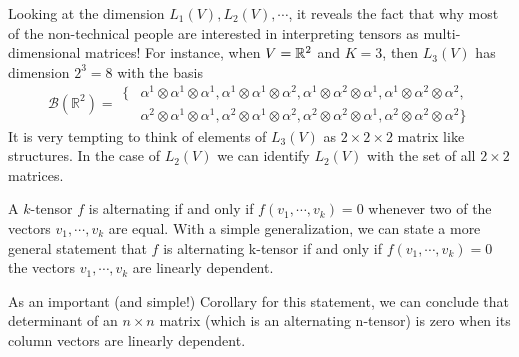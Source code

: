 \begin{summary}
		Looking at the dimension $ L_1(V), L_2(V), \cdots $, it reveals the fact that why most of the non-technical people are interested in interpreting tensors as multi-dimensional matrices! For instance, when $ V = \mathbb{R}^2 $ and $ K=3 $, then $ L_3(V) $ has dimension $ 2^3 = 8 $ with the basis
	\[
	\mathcal{B} (\mathbb{R}^2) = 
	\begin{aligned}
		\{&\alpha^1 \otimes \alpha^1 \otimes \alpha^1, \alpha^1 \otimes \alpha^1 \otimes \alpha^2, \alpha^1 \otimes \alpha^2 \otimes \alpha^1, \alpha^1 \otimes \alpha^2 \otimes \alpha^2, \\
		&\alpha^2 \otimes \alpha^1 \otimes \alpha^1, \alpha^2 \otimes \alpha^1 \otimes \alpha^2, \alpha^2 \otimes \alpha^2 \otimes \alpha^1, \alpha^2 \otimes \alpha^2 \otimes \alpha^2 \}
	\end{aligned}
	\]
	It is very tempting to think of elements of $ L_3(V) $ as $ 2\times 2\times 2 $ matrix like structures. In the case of $ L_2(V) $ we can identify $ L_2(V) $ with the set of all $ 2\times 2 $ matrices.
\end{summary}

\begin{summary}
	A $ k$-tensor $ f $ is alternating if and only if $ f(v_1,\cdots,v_k) = 0 $ whenever two of the vectors $ v_1,\cdots,v_k $ are equal. With a simple generalization, we can state a more general statement that $ f $ is alternating k-tensor if and only if $ f(v_1,\cdots,v_k) = 0 $ the vectors $ v_1,\cdots,v_k $ are linearly dependent.
	
	As an important (and simple!) Corollary for this statement, we can conclude that determinant of an $ n\times n $ matrix (which is an alternating n-tensor) is zero when its column vectors are linearly dependent.
\end{summary}

